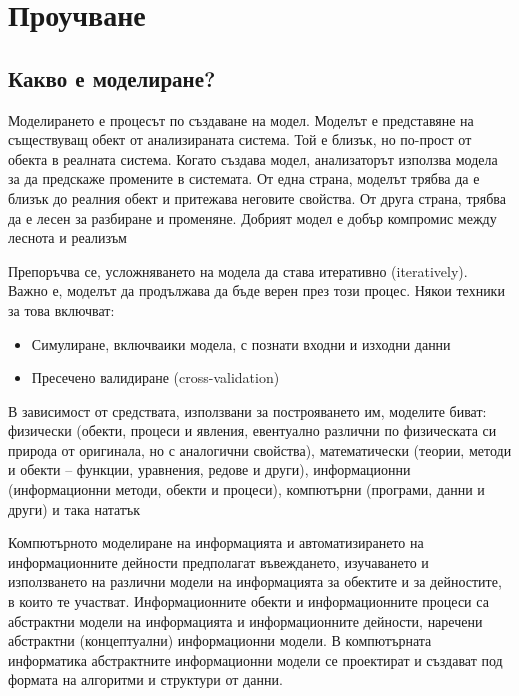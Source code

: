 \section{Проучване}

	\subsection{Какво е моделиране?}
	
		Моделирането е процесът по създаване на модел. Моделът е представяне на съществуващ обект 
		от анализираната система. Той е близък, но по-прост от обекта в реалната система.
		Когато създава модел, анализаторът използва модела за да предскаже промените в системата.
		От една страна, моделът трябва да е близък до реалния обект и притежава неговите свойства.
		От друга страна, трябва да е лесен за разбиране и променяне.
		Добрият модел е добър компромис между леснота и реализъм \cite{Anu}
	
		Препоръчва се, усложняването на модела да става итеративно (iteratively). 
		Важно е, моделът да продължава да бъде верен през този процес. 		
		Някои техники за това включват:		
		
		\begin{itemize}
			\item Симулиране, включваики модела, с познати входни и изходни данни
			\item Пресечено валидиране (cross-validation) \cite{Mahoney}	
		\end{itemize}		 
		
		В зависимост от средствата, използвани за построяването им, моделите биват: физически
		(обекти, процеси и явления, евентуално различни по физическата си природа от оригинала,
		но с аналогични свойства), математически (теории, методи и обекти – функции, уравнения,
		редове и други), информационни (информационни методи, обекти и процеси), компютърни
		(програми, данни и други) и така нататък \cite{Totkov}
		
		Компютърното моделиране на информацията и автоматизирането на
		информационните дейности предполагат въвеждането, изучаването и използването на
		различни модели на информацията за обектите и за дейностите, в които те участват.
		Информационните обекти и информационните процеси са абстрактни модели на
		информацията и информационните дейности, наречени абстрактни (концептуални)
		информационни модели. В компютърната информатика абстрактните информационни
		модели се проектират и създават под формата на алгоритми и структури от данни. \cite{Totkov}
		
